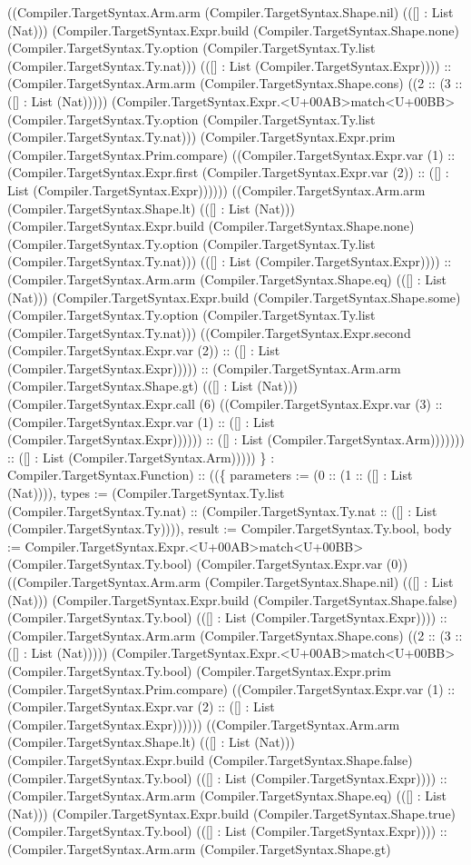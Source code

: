\documentclass[11pt]{article}
\begin{document}
((Compiler.TargetSyntax.Arm.arm (Compiler.TargetSyntax.Shape.nil) (([] : List (Nat))) (Compiler.TargetSyntax.Expr.build (Compiler.TargetSyntax.Shape.none) (Compiler.TargetSyntax.Ty.option (Compiler.TargetSyntax.Ty.list (Compiler.TargetSyntax.Ty.nat))) (([] : List (Compiler.TargetSyntax.Expr)))) :: (Compiler.TargetSyntax.Arm.arm (Compiler.TargetSyntax.Shape.cons) ((2 :: (3 :: ([] : List (Nat))))) (Compiler.TargetSyntax.Expr.<U+00AB>match<U+00BB> (Compiler.TargetSyntax.Ty.option (Compiler.TargetSyntax.Ty.list (Compiler.TargetSyntax.Ty.nat))) (Compiler.TargetSyntax.Expr.prim (Compiler.TargetSyntax.Prim.compare) ((Compiler.TargetSyntax.Expr.var (1) :: (Compiler.TargetSyntax.Expr.first (Compiler.TargetSyntax.Expr.var (2)) :: ([] : List (Compiler.TargetSyntax.Expr)))))) ((Compiler.TargetSyntax.Arm.arm (Compiler.TargetSyntax.Shape.lt) (([] : List (Nat))) (Compiler.TargetSyntax.Expr.build (Compiler.TargetSyntax.Shape.none) (Compiler.TargetSyntax.Ty.option (Compiler.TargetSyntax.Ty.list (Compiler.TargetSyntax.Ty.nat))) (([] : List (Compiler.TargetSyntax.Expr)))) :: (Compiler.TargetSyntax.Arm.arm (Compiler.TargetSyntax.Shape.eq) (([] : List (Nat))) (Compiler.TargetSyntax.Expr.build (Compiler.TargetSyntax.Shape.some) (Compiler.TargetSyntax.Ty.option (Compiler.TargetSyntax.Ty.list (Compiler.TargetSyntax.Ty.nat))) ((Compiler.TargetSyntax.Expr.second (Compiler.TargetSyntax.Expr.var (2)) :: ([] : List (Compiler.TargetSyntax.Expr))))) :: (Compiler.TargetSyntax.Arm.arm (Compiler.TargetSyntax.Shape.gt) (([] : List (Nat))) (Compiler.TargetSyntax.Expr.call (6) ((Compiler.TargetSyntax.Expr.var (3) :: (Compiler.TargetSyntax.Expr.var (1) :: ([] : List (Compiler.TargetSyntax.Expr)))))) :: ([] : List (Compiler.TargetSyntax.Arm))))))) :: ([] : List (Compiler.TargetSyntax.Arm))))) \} : Compiler.TargetSyntax.Function) :: ((\{ parameters := (0 :: (1 :: ([] : List (Nat)))), types := (Compiler.TargetSyntax.Ty.list (Compiler.TargetSyntax.Ty.nat) :: (Compiler.TargetSyntax.Ty.nat :: ([] : List (Compiler.TargetSyntax.Ty)))), result := Compiler.TargetSyntax.Ty.bool, body := Compiler.TargetSyntax.Expr.<U+00AB>match<U+00BB> (Compiler.TargetSyntax.Ty.bool) (Compiler.TargetSyntax.Expr.var (0)) ((Compiler.TargetSyntax.Arm.arm (Compiler.TargetSyntax.Shape.nil) (([] : List (Nat))) (Compiler.TargetSyntax.Expr.build (Compiler.TargetSyntax.Shape.false) (Compiler.TargetSyntax.Ty.bool) (([] : List (Compiler.TargetSyntax.Expr)))) :: (Compiler.TargetSyntax.Arm.arm (Compiler.TargetSyntax.Shape.cons) ((2 :: (3 :: ([] : List (Nat))))) (Compiler.TargetSyntax.Expr.<U+00AB>match<U+00BB> (Compiler.TargetSyntax.Ty.bool) (Compiler.TargetSyntax.Expr.prim (Compiler.TargetSyntax.Prim.compare) ((Compiler.TargetSyntax.Expr.var (1) :: (Compiler.TargetSyntax.Expr.var (2) :: ([] : List (Compiler.TargetSyntax.Expr)))))) ((Compiler.TargetSyntax.Arm.arm (Compiler.TargetSyntax.Shape.lt) (([] : List (Nat))) (Compiler.TargetSyntax.Expr.build (Compiler.TargetSyntax.Shape.false) (Compiler.TargetSyntax.Ty.bool) (([] : List (Compiler.TargetSyntax.Expr)))) :: (Compiler.TargetSyntax.Arm.arm (Compiler.TargetSyntax.Shape.eq) (([] : List (Nat))) (Compiler.TargetSyntax.Expr.build (Compiler.TargetSyntax.Shape.true) (Compiler.TargetSyntax.Ty.bool) (([] : List (Compiler.TargetSyntax.Expr)))) :: (Compiler.TargetSyntax.Arm.arm (Compiler.TargetSyntax.Shape.gt) 
\end{document}
